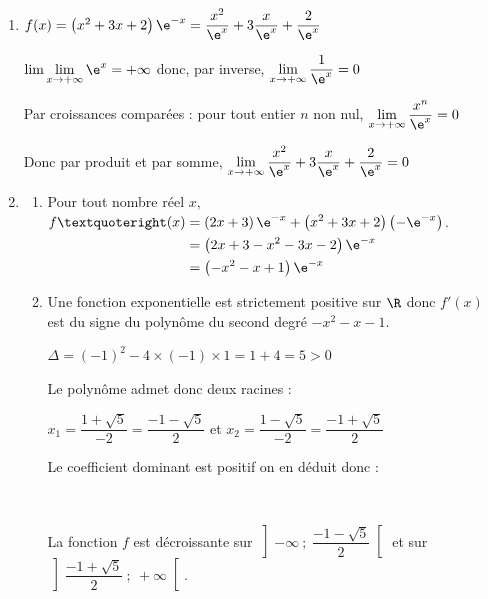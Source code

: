 \begin{enumerate}
\item $f(x)=\left(x^{2}+3 x+2\right) \e^{-x} = \dfrac{x^2}{\e^x}+3 \dfrac{x}{\e^x} + \dfrac{2}{\e^x}$

$\lim\lim\limits_{x\to +\infty }\e^x= +\infty$ donc, par inverse, $\lim\limits_{x\to +\infty }\dfrac{1}{\e^x}=0$

Par croissances comparées : pour tout entier $n$ non nul, $\lim\limits_{x\to +\infty} \dfrac{x^n}{\e^x}= 0$
		
Donc par produit et par somme, $\lim\limits_{x \to +\infty} \dfrac{x^2}{\e^x}+3 \dfrac{x}{\e^x} + \dfrac{2}{\e^x} = 0$
\item 
	\begin{enumerate}
		\item Pour tout nombre réel $x$, 
$\begin{aligned}[t] f’(x)& =\left(2x+3\right) \e^{-x} + \left(x^2+3x+2\right)\left(-\e^{-x}\right)\\
	& = \left( 2x+3-x^2-3x-2\right)\e^{-x}\\
	& = \left(-x^2-x+1\right)\e^{-x}
\end{aligned}$.
\item Une fonction exponentielle est strictement positive sur $\R$ donc $f'(x)$ est du signe du polynôme du second degré $-x^2-x-1$. 

$\Delta=(-1)^2-4 \times (-1)\times 1= 1+4=5>0$

Le polynôme admet donc deux racines : 

$x_1= \dfrac{1+\sqrt{5}}{-2}= \dfrac{-1-\sqrt{5}}{2}$ \quad et \quad $x_2= \dfrac{1-\sqrt{5}}{-2}= \dfrac{-1+\sqrt{5}}{2}$

Le coefficient dominant est positif on en déduit donc :


\hfill~

La fonction $f$ est décroissante sur $\left] -\infty~;~\dfrac{-1-\sqrt{5}}{2}\right[$ et sur $\left] \dfrac{-1+\sqrt{5}}{2}~;~ +\infty \right[$.


\end{enumerate}
\end{enumerate}
